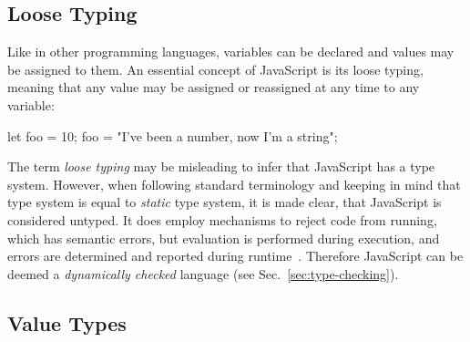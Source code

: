 \subsection{Loose Typing}
\label{sec:untyped-loosely-typed}

Like in other programming languages, variables can be declared and values may be assigned to them. An essential concept of JavaScript is its loose typing, meaning that any value may be assigned or reassigned at any time to any variable:
\begin{JsCode}[numbers=none]
let foo = 10;
foo = "I've been a number, now I'm a string";
\end{JsCode}
The term \emph{loose typing} may be misleading to infer that JavaScript has a type system. However, when following standard terminology and keeping in mind that type system is equal to \emph{static} type system, it is made clear, that JavaScript is considered untyped. It does employ mechanisms to reject code from running, which has semantic errors, but evaluation is performed during execution, and errors are determined and reported during runtime~\cite[p.~291]{ES6Spec:Ecma:2015}. Therefore JavaScript can be deemed a \emph{dynamically checked} language (see Sec.~\ref{sec:type-checking}).

\subsection{Value Types}
\label{sec:value-types}

